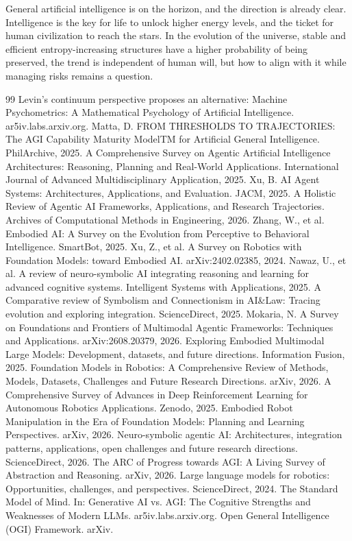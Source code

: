 \documentclass[12pt,a4paper]{article}
\begin{document}
General artificial intelligence is on the horizon, and the direction is already clear. Intelligence is the key for life to unlock higher energy levels, and the ticket for human civilization to reach the stars. In the evolution of the universe, stable and efficient entropy-increasing structures have a higher probability of being preserved, the trend is independent of human will, but how to align with it while managing risks remains a question.

\begin{thebibliography}{99}
 Levin's continuum perspective proposes an alternative: Machine Psychometrics: A Mathematical Psychology of Artificial Intelligence. ar5iv.labs.arxiv.org.
 Matta, D. FROM THRESHOLDS TO TRAJECTORIES: The AGI Capability Maturity ModelTM for Artificial General Intelligence. PhilArchive, 2025.
 A Comprehensive Survey on Agentic Artificial Intelligence Architectures: Reasoning, Planning and Real-World Applications. International Journal of Advanced Multidisciplinary Application, 2025.
 Xu, B. AI Agent Systems: Architectures, Applications, and Evaluation. JACM, 2025.
 A Holistic Review of Agentic AI Frameworks, Applications, and Research Trajectories. Archives of Computational Methods in Engineering, 2026.
 Zhang, W., et al. Embodied AI: A Survey on the Evolution from Perceptive to Behavioral Intelligence. SmartBot, 2025.
 Xu, Z., et al. A Survey on Robotics with Foundation Models: toward Embodied AI. arXiv:2402.02385, 2024.
 Nawaz, U., et al. A review of neuro-symbolic AI integrating reasoning and learning for advanced cognitive systems. Intelligent Systems with Applications, 2025.
 A Comparative review of Symbolism and Connectionism in AI\&Law: Tracing evolution and exploring integration. ScienceDirect, 2025.
 Mokaria, N. A Survey on Foundations and Frontiers of Multimodal Agentic Frameworks: Techniques and Applications. arXiv:2608.20379, 2026.
 Exploring Embodied Multimodal Large Models: Development, datasets, and future directions. Information Fusion, 2025.
 Foundation Models in Robotics: A Comprehensive Review of Methods, Models, Datasets, Challenges and Future Research Directions. arXiv, 2026.
 A Comprehensive Survey of Advances in Deep Reinforcement Learning for Autonomous Robotics Applications. Zenodo, 2025.
 Embodied Robot Manipulation in the Era of Foundation Models: Planning and Learning Perspectives. arXiv, 2026.
 Neuro-symbolic agentic AI: Architectures, integration patterns, applications, open challenges and future research directions. ScienceDirect, 2026.
 The ARC of Progress towards AGI: A Living Survey of Abstraction and Reasoning. arXiv, 2026.
 Large language models for robotics: Opportunities, challenges, and perspectives. ScienceDirect, 2024.
 The Standard Model of Mind. In: Generative AI vs. AGI: The Cognitive Strengths and Weaknesses of Modern LLMs. ar5iv.labs.arxiv.org.
 Open General Intelligence (OGI) Framework. arXiv.
\end{thebibliography}
\end{document}
